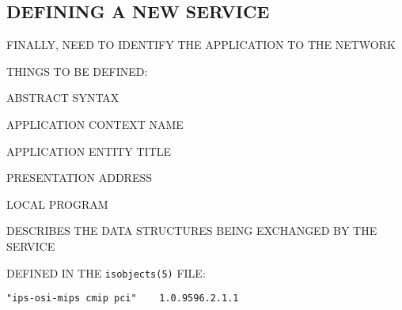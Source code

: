 



\begin{bwslide}
\part*	{DEFINING A NEW SERVICE}\bf

\begin{nrtc}
\item	FINALLY, NEED TO IDENTIFY THE APPLICATION TO THE NETWORK

\item	THINGS TO BE DEFINED:
    \begin{nrtc}
    \item	ABSTRACT SYNTAX

    \item	APPLICATION CONTEXT NAME

    \item	APPLICATION ENTITY TITLE

    \item	PRESENTATION ADDRESS

    \item	LOCAL PROGRAM
    \end{nrtc}
\end{nrtc}
\end{bwslide}


\begin{bwslide}

\begin{nrtc}
\item	DESCRIBES THE DATA STRUCTURES BEING EXCHANGED BY THE SERVICE

\item	DEFINED IN THE \verb"isobjects(5)" FILE:
\begin{verbatim}
"ips-osi-mips cmip pci"    1.0.9596.2.1.1
\end{verbatim}
\end{nrtc}
\end{bwslide}


